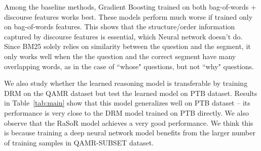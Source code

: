 Among the baseline methods, Gradient Boosting trained on both bag-of-words + discourse features works best. These models perform much worse if trained only on bag-of-words features. This shows that the structure/order information captured by discourse features is essential, which Neural network doesn't do. 
Since BM25 solely relies on similarity between the question and the segment, it only works well when the the question and the correct segment have many overlapping words, as in the case of ``whose" questions, but not ``why" questions.

We also study whether the learned reasoning model is transferable by training DRM on the QAMR dataset but test the learned model on PTB dataset. Results in Table~\ref{tab:main} show that this model generalizes well on PTB dataset -- its performance is very close to the DRM model trained on PTB directly. We also observe that the RaSoR model achieves a very good performance. We think this is because training a deep neural network model benefits from the larger number of training samples in QAMR-SUBSET dataset. 


